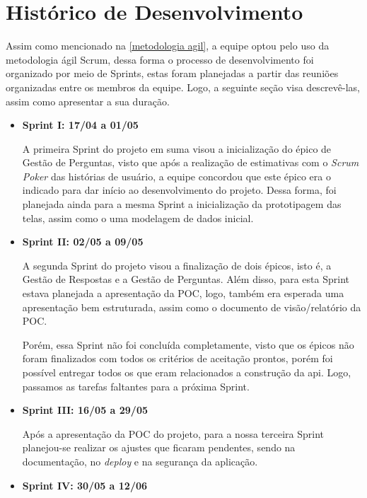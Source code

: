 \chapter{Histórico de Desenvolvimento}
Assim como mencionado na \autoref{metodologia agil}, a equipe optou pelo uso da metodologia ágil Scrum, dessa forma o processo de desenvolvimento foi organizado por meio de \glspl{Sprint}, estas foram planejadas a partir das reuniões organizadas entre os membros da equipe. Logo, a seguinte seção visa descrevê-las, assim como apresentar a sua duração.

\begin{itemize}
\item {\textbf{Sprint I: 17/04 a 01/05}}
    
A primeira \gls{Sprint} do projeto em suma visou a inicialização do épico de Gestão de Perguntas, visto que após a realização de estimativas com o \textsl{Scrum Poker} das histórias de usuário, a equipe concordou que este épico era o indicado para dar início ao desenvolvimento do projeto. Dessa forma, foi planejada ainda para a mesma \gls{Sprint} a inicialização da prototipagem das telas, assim como o uma modelagem de dados inicial.
\item {\textbf{Sprint II: 02/05 a 09/05}}
    
A segunda \gls{Sprint} do projeto visou a finalização de dois épicos, isto é, a Gestão de Respostas e a Gestão de Perguntas. Além disso, para esta \gls{Sprint} estava planejada a apresentação da \gls{POC}, logo, também era esperada uma apresentação bem estruturada, assim como o documento de visão/relatório da \gls{POC}. 

Porém, essa \gls{Sprint} não foi concluída completamente, visto que os épicos não foram finalizados com todos os critérios de aceitação prontos, porém foi possível entregar todos os que eram relacionados a construção da \acs{api}. Logo, passamos as tarefas faltantes para a próxima Sprint.
\item {\textbf{Sprint III: 16/05 a 29/05}}
    
Após a apresentação da \gls{POC} do projeto, para a nossa terceira \gls{Sprint} planejou-se realizar os ajustes que ficaram pendentes, sendo na documentação, no \textit{deploy} e na segurança da aplicação. 
\item {\textbf{Sprint IV: 30/05 a 12/06}}
    

\end{itemize}
